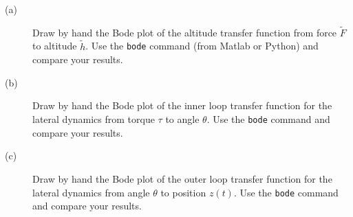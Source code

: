 \begin{description} \item[]
\item[(a)] Draw by hand the Bode plot of the altitude transfer function from force $\tilde{F}$ to altitude $\tilde{h}$.
Use the \texttt{bode} command (from Matlab or Python) and compare your results.
\item[(b)] Draw by hand the Bode plot of the inner loop transfer function for the lateral dynamics from torque $\tau$ to angle $\theta$. Use the \texttt{bode} command and compare your results.
\item[(c)] Draw by hand the Bode plot of the outer loop transfer function for the lateral dynamics from angle $\theta$ to position $z(t)$. Use the \texttt{bode} command and compare your results.

\end{description}
